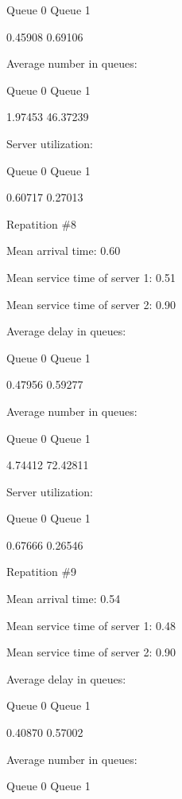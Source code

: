 \documentclass{article}
\begin{document}
Queue 0		Queue 1		



0.45908		0.69106		



Average number in queues:

Queue 0		Queue 1		



1.97453		46.37239		



Server utilization:

Queue 0		Queue 1		



0.60717		0.27013		



 Repatition \#8

Mean arrival time: 0.60

Mean service time of server 1: 0.51

Mean service time of server 2: 0.90



Average delay in queues:

Queue 0		Queue 1		



0.47956		0.59277		



Average number in queues:

Queue 0		Queue 1		



4.74412		72.42811		



Server utilization:

Queue 0		Queue 1		



0.67666		0.26546		



 Repatition \#9

Mean arrival time: 0.54

Mean service time of server 1: 0.48

Mean service time of server 2: 0.90



Average delay in queues:

Queue 0		Queue 1		



0.40870		0.57002		



Average number in queues:

Queue 0		Queue 1		
\end{document}
